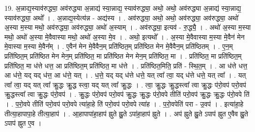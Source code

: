\documentclass[17pt]{extarticle}
\begin{document}
19. अ॒न्नाद्य॒स्याव॑रुद्ध्या॒ अव॑रुद्ध्या अ॒न्नाद्य॑ स्या॒न्नाद्य॒ स्याव॑रुद्ध्या॒ अथो॒ अथो॒ अव॑रुद्ध्या अ॒न्नाद्य॑ स्या॒न्नाद्य॒ स्याव॑रुद्ध्या॒ अथो᳚ । . अ॒न्नाद्य॒स्येत्य॑न्न - अद्य॑स्य । . अव॑रुद्ध्या॒ अथो॒ अथो॒ अव॑रुद्ध्या॒ अव॑रुद्ध्या॒ अथो॑ अ॒स्या म॒स्या मथो॒ अव॑रुद्ध्या॒ अव॑रुद्ध्या॒ अथो॑ अ॒स्याम् । . अव॑रुद्ध्या॒ इत्यव॑ - रु॒द्ध्यै॒ । . अथो॑ अ॒स्या म॒स्या मथो॒ अथो॑ अ॒स्या मे॒वैवास्या मथो॒ अथो॑ अ॒स्या मे॒व । . अथो॒ इत्यथो᳚ । . अ॒स्या मे॒वैवास्या म॒स्या मे॒वैन॑ मेन मे॒वास्या म॒स्या मे॒वैन᳚म् । . ए॒वैन॑ मेन मे॒वैवैन॒म् प्रति॑ष्ठित॒म् प्रति॑ष्ठित मेन मे॒वैवैन॒म् प्रति॑ष्ठितम् । . ए॒न॒म् प्रति॑ष्ठित॒म् प्रति॑ष्ठित मेन मेन॒म् प्रति॑ष्ठित॒ मा प्रति॑ष्ठित मेन मेन॒म् प्रति॑ष्ठित॒ मा । . प्रति॑ष्ठित॒ मा प्रति॑ष्ठित॒म् प्रति॑ष्ठित॒ मा ध॑त्ते धत्त॒ आ प्रति॑ष्ठित॒म् प्रति॑ष्ठित॒ मा ध॑त्ते । . प्रति॑ष्ठित॒मिति॒ प्रति॑ - स्थि॒त॒म् । . आ ध॑त्ते धत्त॒ आ ध॑त्ते॒ यद् यद् ध॑त्त॒ आ ध॑त्ते॒ यत् । . ध॒त्ते॒ यद् यद् ध॑त्ते धत्ते॒ यत् त्वा᳚ त्वा॒ यद् ध॑त्ते धत्ते॒ यत् त्वा᳚ । . यत् त्वा᳚ त्वा॒ यद् यत् त्वा᳚ क्रु॒द्धः क्रु॒द्ध स्त्वा॒ यद् यत् त्वा᳚ क्रु॒द्धः । . त्वा॒ क्रु॒द्धः क्रु॒द्धस्त्वा᳚ त्वा क्रु॒द्धः प॑रो॒वप॑ परो॒वप॑ क्रु॒द्धस्त्वा᳚ त्वा क्रु॒द्धः प॑रो॒वप॑ । . क्रु॒द्धः प॑रो॒वप॑ परो॒वप॑ क्रु॒द्धः क्रु॒द्धः प॑रो॒वपे तीति॑ परो॒वप॑ क्रु॒द्धः क्रु॒द्धः प॑रो॒वपे ति॑ । . प॒रो॒वपे तीति॑ परो॒वप॑ परो॒वपे त्या॑हा॒हे ति॑ परो॒वप॑ परो॒वपे त्या॑ह । . प॒रो॒वपेति॑ परा - उ॒वप॑ । . इत्या॑हा॒हे तीत्या॒हापापा॒हे तीत्या॒हाप॑ । . आ॒हापापा॑हा॒हाप॑ ह्नुते ह्नु॒ते ऽपा॑हा॒हाप॑ ह्नुते । . अप॑ ह्नुते ह्नु॒ते ऽपाप॑ ह्नुत ए॒वैव ह्नु॒ते ऽपाप॑ ह्नुत ए॒व । \newline
\end{document}
